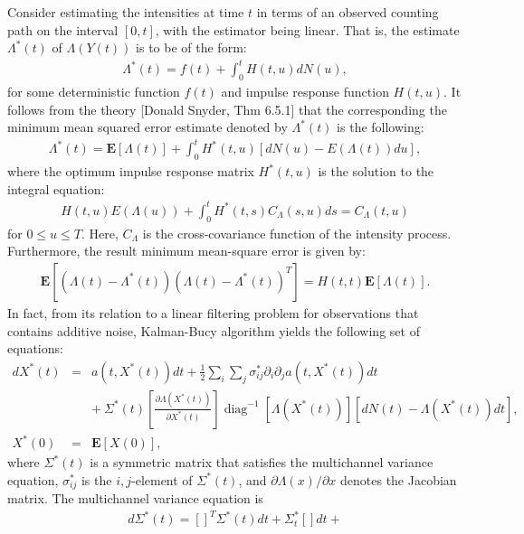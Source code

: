 \documentclass[12pt]{article}%
\begin{document}
Consider estimating the intensities at time $t$ in terms of an observed counting path on the interval $[0,t]$,
with the estimator being linear.  That is, the estimate $\Lambda^{*}(t)$ of $\Lambda(Y(t))$ is to be of 
the form:
\begin{eqnarray}
\Lambda^{*}(t) = f(t) + \int_0^t H(t,u) dN(u),
\end{eqnarray}
for some deterministic function $f(t)$ and impulse response function $H(t,u)$.  It follows from the theory [Donald Snyder, Thm 6.5.1] that the corresponding the minimum mean squared error estimate denoted by ${\Lambda}^*(t)$ is the following:
\begin{eqnarray}
{\Lambda}^*(t) = \mathbf E[\Lambda(t)] + \int_0^t H^*(t,u)\left[dN(u) - E(\Lambda(t))du\right],
\end{eqnarray}
where the optimum impulse response matrix $H^*(t,u)$ is the solution to the integral equation:
\begin{eqnarray}
H(t,u) E(\Lambda(u)) 
+
\int_0^t H^*(t,s) C_{\Lambda}(s,u) ds = C_{\Lambda}(t,u)
\end{eqnarray}
for $0 \le u \le T$.  Here, $C_{\Lambda}$ is the cross-covariance function 
of the intensity process.  
Furthermore, the result minimum mean-square error is given by:
\begin{eqnarray}
\mathbf E[(\Lambda(t) - {\Lambda}^*(t))(\Lambda(t) - {\Lambda}^*(t))^T] 
= 
H(t,t) \mathbf E[\Lambda(t)]. 
\end{eqnarray}
In fact, from its relation to a linear filtering problem 
for observations that contains additive noise, Kalman-Bucy algorithm yields
the following set of equations:
\begin{eqnarray*}
d{X}^*(t)
&= & a(t,X^*(t))dt + \frac{1}{2} \sum_{i} \sum_{j} \sigma_{ij}^* \partial_{i}\partial_{j} a(t,X^*(t)) dt \\
&\ & +\ \Sigma^*(t) \left[ \frac{\partial \Lambda(X^*(t)) }{\partial X^*(t)} \right] {\mathop{diag}}^{-1}\left[\Lambda(X^*(t))\right]\left[dN(t) - \Lambda(X^*(t))dt\right],\\
X^*(0) &=& \mathbf E[X(0)],
\end{eqnarray*} 
where $\Sigma^*(t)$ is a symmetric matrix that satisfies the multichannel variance equation,
$\sigma_{ij}^*$ is the $i,j$-element of $\Sigma^*(t)$, and $\partial \Lambda(x)/\partial x$ denotes the Jacobian matrix.  The multichannel variance equation is
\begin{eqnarray}
d\Sigma^*(t) 
=
\left[ \right]^T
\Sigma^*(t) dt 
+
\Sigma_t^* 
\left[ \right]
dt
+
\end{eqnarray}
\end{document}
